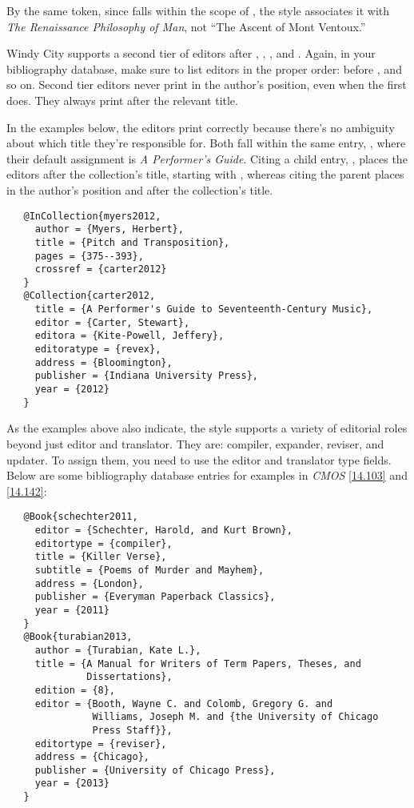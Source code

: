 \documentclass[11pt,letterpaper,oneside]{article}
\begin{document}
\noindent By the same token, since  falls within the
scope of , the style associates it with
\textit{The Renaissance Philosophy of Man}, not ``The Ascent of Mont
Ventoux.''

Windy City supports a second tier of editors after ,
, , and .
Again, in your bibliography database, make sure to list editors in the
proper order:  before , and so on.
Second tier editors never print in the author's position, even when
the first does. They always print after the relevant title.

In the examples below, the editors print correctly because there's no
ambiguity about which title they're responsible for. Both fall within
the same entry, , where their default assignment
is \textit{A Performer's Guide}. Citing a child entry,
, places the editors after the collection's title,
starting with , whereas citing the parent places
 in the author's position and 
after the collection's title.

\begin{verbatim}
   @InCollection{myers2012,
     author = {Myers, Herbert},
     title = {Pitch and Transposition},
     pages = {375--393},
     crossref = {carter2012}
   }
   @Collection{carter2012,
     title = {A Performer's Guide to Seventeenth-Century Music},
     editor = {Carter, Stewart},
     editora = {Kite-Powell, Jeffery},
     editoratype = {revex},
     address = {Bloomington},
     publisher = {Indiana University Press},
     year = {2012}
   }
\end{verbatim}

\begin{bibonly}
\nocite{myers2012,carter2012}
\end{bibonly}

As the examples above also indicate, the style supports a variety of
editorial roles beyond just editor and translator. They are: compiler,
expander, reviser, and updater. To assign them, you need to use the
editor and translator type fields. Below are some bibliography
database entries for examples in \textit{CMOS} \ref{14.103} and
\ref{14.142}:

\begin{verbatim}
   @Book{schechter2011,
     editor = {Schechter, Harold, and Kurt Brown},
     editortype = {compiler},
     title = {Killer Verse},
     subtitle = {Poems of Murder and Mayhem},
     address = {London},
     publisher = {Everyman Paperback Classics},
     year = {2011}
   }
   @Book{turabian2013,
     author = {Turabian, Kate L.},
     title = {A Manual for Writers of Term Papers, Theses, and
              Dissertations},
     edition = {8},
     editor = {Booth, Wayne C. and Colomb, Gregory G. and
               Williams, Joseph M. and {the University of Chicago
               Press Staff}},
     editortype = {reviser},
     address = {Chicago},
     publisher = {University of Chicago Press},
     year = {2013}
   }
\end{verbatim}
\end{document}
